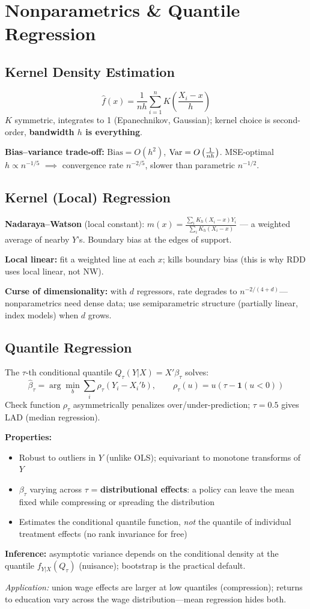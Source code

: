 \section{Nonparametrics \& Quantile Regression}

\subsection{Kernel Density Estimation}
$$\hat f(x) = \frac{1}{nh}\sum_{i=1}^n K\!\left(\frac{X_i - x}{h}\right)$$
$K$ symmetric, integrates to 1 (Epanechnikov, Gaussian); kernel choice is second-order, \textbf{bandwidth $h$ is everything}.

\textbf{Bias--variance trade-off:} $\text{Bias} = O(h^2)$, $\text{Var} = O\left(\frac{1}{nh}\right)$. MSE-optimal $h \propto n^{-1/5}$ $\implies$ convergence rate $n^{-2/5}$, slower than parametric $n^{-1/2}$.

\subsection{Kernel (Local) Regression}
\textbf{Nadaraya--Watson} (local constant): $\hat m(x) = \frac{\sum_i K_h(X_i - x)Y_i}{\sum_i K_h(X_i - x)}$ --- a weighted average of nearby $Y$'s. Boundary bias at the edges of support.

\textbf{Local linear:} fit a weighted line at each $x$; kills boundary bias (this is why RDD uses local linear, not NW).

\textbf{Curse of dimensionality:} with $d$ regressors, rate degrades to $n^{-2/(4+d)}$---nonparametrics need dense data; use semiparametric structure (partially linear, index models) when $d$ grows.

\subsection{Quantile Regression}
The $\tau$-th conditional quantile $Q_\tau(Y|X) = X'\beta_\tau$ solves:
$$\hat\beta_\tau = \arg\min_b \sum_i \rho_\tau(Y_i - X_i'b), \qquad \rho_\tau(u) = u(\tau - \mathbf{1}(u<0))$$
Check function $\rho_\tau$ asymmetrically penalizes over/under-prediction; $\tau = 0.5$ gives LAD (median regression).

\textbf{Properties:}
\begin{itemize}[nosep]
  \item Robust to outliers in $Y$ (unlike OLS); equivariant to monotone transforms of $Y$
  \item $\beta_\tau$ varying across $\tau$ = \textbf{distributional effects}: a policy can leave the mean fixed while compressing or spreading the distribution
  \item Estimates the conditional quantile function, \textit{not} the quantile of individual treatment effects (no rank invariance for free)
\end{itemize}

\textbf{Inference:} asymptotic variance depends on the conditional density at the quantile $f_{Y|X}(Q_\tau)$ (nuisance); bootstrap is the practical default.

\textit{Application:} union wage effects are larger at low quantiles (compression); returns to education vary across the wage distribution---mean regression hides both.
